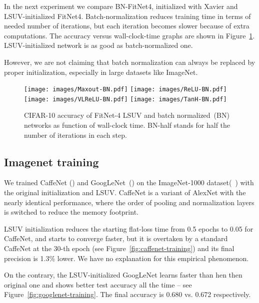 \documentclass{article} \clearpage{}\usepackage{iclr2016_conference,times}
\begin{document}
In the next experiment we compare BN-FitNet4, initialized with Xavier and LSUV-initialized FitNet4. Batch-normalization reduces training time in terms of needed number of iterations, but each iteration becomes slower because of extra computations. 
The accuracy versus wall-clock-time graphs are shown in Figure~\ref{fig:BN-vs-LSUV}. LSUV-initialized network is as good as batch-normalized one. 

However, we are not claiming that batch normalization can always be replaced by proper initialization, especially in large datasets like ImageNet. 

\begin{figure}
\centering
\texttt{[image: images/Maxout-BN.pdf]}
\texttt{[image: images/ReLU-BN.pdf]}\\
\texttt{[image: images/VLReLU-BN.pdf]}
\texttt{[image: images/TanH-BN.pdf]}\\
\caption{CIFAR-10 accuracy of FitNet-4 LSUV and batch normalized~(BN) networks as function of wall-clock time. BN-half stands for half the number of iterations in each step.}
\label{fig:BN-vs-LSUV}
\end{figure}

\subsection{Imagenet training}
We trained CaffeNet (\cite{jia2014caffe}) and GoogLeNet~(\cite{Googlenet2015}) on the ImageNet-1000 dataset(~\cite{ILSVRC15}) with the original initialization and LSUV. CaffeNet is a variant of AlexNet with the nearly identical performance, where the order of pooling and normalization layers is switched to reduce the memory footprint. 

LSUV initialization reduces the starting flat-loss time from 0.5 epochs to 0.05 for CaffeNet, and starts to converge faster, but it is overtaken by a standard CaffeNet at the 30-th epoch (see Figure~\ref{fig:caffenet-training}) and its final precision is 1.3\% lower. We have no explanation for this empirical phenomenon.

On the contrary, the LSUV-initialized GoogLeNet learns faster than hen then original one and shows better test accuracy all the time -- see Figure~\ref{fig:googlenet-training}. The final accuracy is 0.680 vs. 0.672 respectively.
\end{document}
